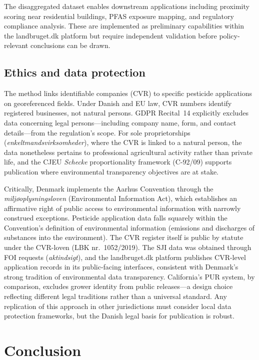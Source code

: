 \documentclass[12pt,a4paper]{article}
\begin{document}
The disaggregated dataset enables downstream applications including proximity scoring near residential buildings, PFAS exposure mapping, and regulatory compliance analysis. These are implemented as preliminary capabilities within the landbruget.dk platform but require independent validation before policy-relevant conclusions can be drawn.

\subsection{Ethics and data protection}

The method links identifiable companies (CVR) to specific pesticide applications on georeferenced fields. Under Danish and EU law, CVR numbers identify registered businesses, not natural persons. GDPR Recital~14 explicitly excludes data concerning legal persons---including company name, form, and contact details---from the regulation's scope. For sole proprietorships (\textit{enkeltmandsvirksomheder}), where the CVR is linked to a natural person, the data nonetheless pertains to professional agricultural activity rather than private life, and the CJEU \textit{Schecke} proportionality framework (C-92/09) supports publication where environmental transparency objectives are at stake.

Critically, Denmark implements the Aarhus Convention through the \textit{milj\o{}oplysningsloven} (Environmental Information Act), which establishes an affirmative right of public access to environmental information with narrowly construed exceptions. Pesticide application data falls squarely within the Convention's definition of environmental information (emissions and discharges of substances into the environment). The CVR register itself is public by statute under the CVR-loven (LBK nr.\ 1052/2019). The SJI data was obtained through FOI requests (\textit{aktindsigt}), and the landbruget.dk platform publishes CVR-level application records in its public-facing interfaces, consistent with Denmark's strong tradition of environmental data transparency. California's PUR system, by comparison, excludes grower identity from public releases---a design choice reflecting different legal traditions rather than a universal standard. Any replication of this approach in other jurisdictions must consider local data protection frameworks, but the Danish legal basis for publication is robust.

\section{Conclusion}
\end{document}
